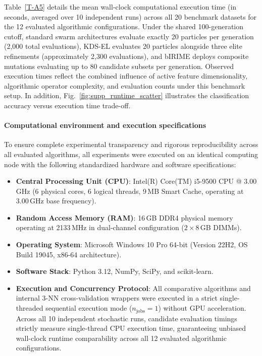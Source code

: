 \documentclass[final,1p,times,fleqn]{elsarticle}
\begin{document}
Table~\ref{T-A5} details the mean wall-clock computational execution time (in seconds, averaged over 10 independent runs) across all 20 benchmark datasets for the 12 evaluated algorithmic configurations. Under the shared 100-generation cutoff, standard swarm architectures evaluate exactly 20 particles per generation (2{,}000 total evaluations), KDS-EL evaluates 20 particles alongside three elite refinements (approximately 2{,}300 evaluations), and bIRIME deploys composite mutations evaluating up to 80 candidate subsets per generation. Observed execution times reflect the combined influence of active feature dimensionality, algorithmic operator complexity, and evaluation counts under this benchmark setup. In addition, Fig.~\ref{fig:supp_runtime_scatter} illustrates the classification accuracy versus execution time trade-off.

\paragraph{Computational environment and execution specifications}
To ensure complete experimental transparency and rigorous reproducibility across all evaluated algorithms, all experiments were executed on an identical computing node with the following standardized hardware and software specifications:
\begin{itemize}
    \item \textbf{Central Processing Unit (CPU)}: Intel(R) Core(TM) i5-9500 CPU @ 3.00\,GHz (6 physical cores, 6 logical threads, 9\,MB Smart Cache, operating at 3.00\,GHz base frequency).
    \item \textbf{Random Access Memory (RAM)}: 16\,GB DDR4 physical memory operating at 2133\,MHz in dual-channel configuration ($2 \times 8$\,GB DIMMs).
    \item \textbf{Operating System}: Microsoft Windows 10 Pro 64-bit (Version 22H2, OS Build 19045, x86-64 architecture).
    \item \textbf{Software Stack}: Python 3.12, NumPy, SciPy, and scikit-learn.
    \item \textbf{Execution and Concurrency Protocol}: All comparative algorithms and internal 3-NN cross-validation wrappers were executed in a strict single-threaded sequential execution mode ($n_{\mathrm{jobs}} = 1$) without GPU acceleration. Across all 10 independent stochastic runs, candidate evaluation timings strictly measure single-thread CPU execution time, guaranteeing unbiased wall-clock runtime comparability across all 12 evaluated algorithmic configurations.
\end{itemize}
\end{document}
